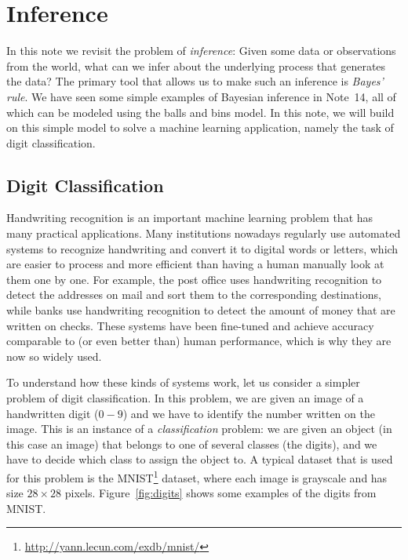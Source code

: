 \documentclass[11pt]{article}
\begin{document}
\maketitle

\section*{Inference}

In this note we revisit the problem of {\em inference}: 
Given some data or observations from the world, what can we infer about the underlying process that generates the data? The primary tool that allows us to make such an inference is {\em Bayes' rule}. We have seen some simple examples of Bayesian inference in Note~14, all of which can be modeled using the balls and bins model. In this note, we will build on this simple model to solve a machine learning application, namely the task of digit classification.


\subsection*{Digit Classification}

Handwriting recognition is an important machine learning problem that has many practical applications. Many institutions nowadays regularly use automated systems to recognize handwriting and convert it to digital words or letters, which are easier to process and more efficient than having a human manually look at them one by one. For example, the post office uses handwriting recognition to detect the addresses on mail and sort them to the corresponding destinations, while banks use handwriting recognition to detect the amount of money that are written on checks. These systems have been fine-tuned and achieve accuracy comparable to (or even better than) human performance, which is why they are now so widely used.

To understand how these kinds of systems work, let us consider a simpler problem of digit classification. In this problem, we are given an image of a handwritten digit ($0-9$) and we have to identify the number written on the image. This is an instance of a {\em classification} problem: we are given an object (in this case an image) that belongs to one of several classes (the digits), and we have to decide which class to assign the object to. A typical dataset that is used for this problem is the MNIST\footnote{\url{http://yann.lecun.com/exdb/mnist/}} dataset, where each image is grayscale and has size $28 \times 28$ pixels. Figure~\ref{fig:digits} shows some examples of the digits from MNIST.
\end{document}

